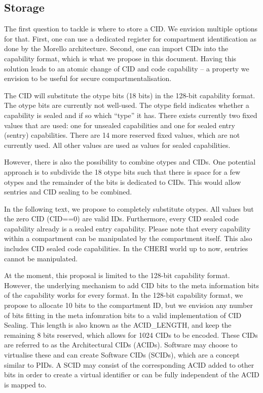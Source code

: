\subsection{Storage}

The first question to tackle is where to store a CID. We envision multiple options for that.
First, one can use a dedicated register for compartment identification as done by the Morello architecture.
Second, one can import CIDs into the capability format, which is what we propose in this document.
Having this solution leads to an atomic change of CID and code capability -- a property we envision to be useful for secure compartmentalisation.

The CID will substitute the otype bits (18 bits) in the 128-bit capability format.
The otype bits are currently not well-used. The otype field indicates whether a capability is sealed and if so which “type” it has.
There exists currently two fixed values that are used: one for unsealed capabilities and one for sealed entry (sentry) capabilities.
There are 14 more reserved fixed values, which are not currently used. All other values are used as values for sealed capabilities.

However, there is also the possibility to combine otypes and CIDs.
One potential approach is to subdivide the 18 otype bits such that there is space for a few otypes and the remainder of the bits is dedicated to CIDs.
This would allow sentries and CID sealing to be combined.

In the following text, we propose to completely substitute otypes.
All values but the zero CID (CID==0) are valid IDs.
Furthermore, every CID sealed code capability already is a sealed entry capability.
Please note that every capability within a compartment can be manipulated by the compartment itself.
This also includes CID sealed code capabilities.
In the CHERI world up to now, sentries cannot be manipulated.

At the moment, this proposal is limited to the 128-bit capability format.
However, the underlying mechanism to add CID bits to the meta information bits of the capability works for every format.
In the 128-bit capability format, we propose to allocate 10 bits to the compartment ID, but we envision any number of bits fitting in the meta  infomration bits to a valid implementation of CID Sealing.
This length is also known as the ACID\_LENGTH, and keep the remaining 8 bits reserved, which allows for 1024 CIDs to be encoded.
These CIDs are referred to as the Architectural CIDs (ACIDs).
Software may choose to virtualise these and can create Software CIDs (SCIDs), which are a concept similar to PIDs.
A SCID may consist of the corresponding ACID added to other bits in order to create a virtual identifier or can be fully independent of the ACID is mapped to.

